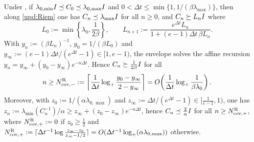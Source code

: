 \begin{lemma}\label{lem:cov-Riem}
    Under , if
    $\lambda_{0,\min}I\preceq C_0\preceq\lambda_{0,\max}I$ and
    $0<\Delta t\leq\min\{1,1/(\beta\lambda_{\max})\}$, then along \eqref{upd:Riem} one has
    $C_n\preceq\lambda_{\max}I$ for all $n\geq0$, and $C_n\succeq L_nI$ where
    \begin{equation*}
        L_0:=\min\left\{\lambda_0,\frac1{2\beta}\right\},
        \qquad
        L_{n+1}:=\frac{e^{\Delta t}L_n}{1+(e-1)\Delta t\,\beta L_n}.
    \end{equation*}
    With $y_n:=(\beta L_n)^{-1}$, $y_0=1/(\beta L_0)$ and
    $y_\infty:=(e-1)\Delta t/(e^{\Delta t}-1)\in[1,e-1)$, the envelope solves the affine
    recursion $y_n=y_\infty+(y_0-y_\infty)e^{-n\Delta t}$. Hence
    $C_n\succeq\tfrac1{2\beta}I$ for all
    \begin{equation*}
        n\geq
        N_{\mathrm{cov},-}^{\mathrm{R}}
        :=
        \left\lceil\frac1{\Delta t}\log_+\frac{y_0-y_\infty}{2-y_\infty}\right\rceil
        =
        O\!\left(\frac1{\Delta t}\log_+\frac1{\beta\lambda_0}\right).
    \end{equation*}
    Moreover, with $z_0:=1/(\alpha\lambda_{0,\max})$ and
    $z_\infty:=\Delta t/(e^{\Delta t}-1)\in[\tfrac1{e-1},1)$, one has
    $z_n:=\lambda_{\min}(C_n^{-1})/\alpha\geq z_\infty+(z_0-z_\infty)e^{-n\Delta t}$, hence
    $C_n\preceq\tfrac2\alpha I$ for all $n\geq N_{\mathrm{cov},+}^{\mathrm{R}}$, where
    $N_{\mathrm{cov},+}^{\mathrm{R}}:=0$ if $z_0\geq\tfrac12$ and
    $N_{\mathrm{cov},+}^{\mathrm{R}}:=\lceil\Delta t^{-1}\log\frac{z_\infty-z_0}{z_\infty-1/2}\rceil
    =O(\Delta t^{-1}\log_+(\alpha\lambda_{0,\max}))$ otherwise.
\end{lemma}


